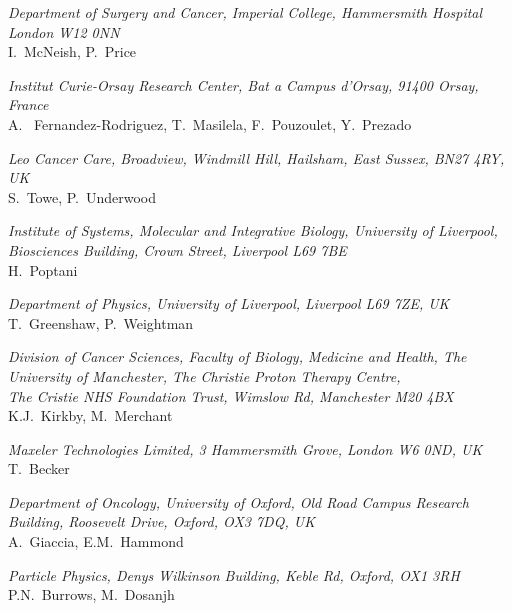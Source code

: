 \vspace{0.5cm}
\noindent \textit{Department of Surgery and Cancer, Imperial College, Hammersmith Hospital London W12 0NN} \\
I.~McNeish, P.~Price
 
\vspace{0.5cm}
\noindent \textit{Institut Curie-Orsay Research Center, Bat a Campus d'Orsay, 91400 Orsay, France} \\
A. ~Fernandez-Rodriguez, T.~Masilela, F.~Pouzoulet, Y.~Prezado
 
\vspace{0.5cm}
\noindent \textit{Leo Cancer Care, Broadview, Windmill Hill, Hailsham, East Sussex, BN27 4RY, UK} \\
S.~Towe, P.~Underwood
 
\vspace{0.5cm}
\noindent \textit{Institute of Systems, Molecular and Integrative Biology, University of Liverpool, Biosciences Building, Crown Street, Liverpool L69 7BE} \\
H.~Poptani
 
\vspace{0.5cm}
\noindent \textit{Department of Physics, University of Liverpool, Liverpool L69 7ZE, UK} \\
T.~Greenshaw, P.~Weightman
 
\vspace{0.5cm}
\noindent \textit{Division of Cancer Sciences, Faculty of Biology, Medicine and Health, The University of Manchester, The Christie Proton Therapy Centre, \\ \> The Cristie NHS Foundation Trust, Wimslow Rd, Manchester M20 4BX} \\
K.J.~Kirkby, M.~Merchant
 
\vspace{0.5cm}
\noindent \textit{Maxeler Technologies Limited, 3 Hammersmith Grove, London W6 0ND, UK} \\
T.~Becker
 
\vspace{0.5cm}
\noindent \textit{Department of Oncology, University of Oxford, Old Road Campus Research Building, Roosevelt Drive, Oxford, OX3 7DQ, UK} \\
A.~Giaccia, E.M.~Hammond
 
\vspace{0.5cm}
\noindent \textit{Particle Physics, Denys Wilkinson Building, Keble Rd, Oxford, OX1 3RH} \\
P.N.~Burrows, M.~Dosanjh
 
